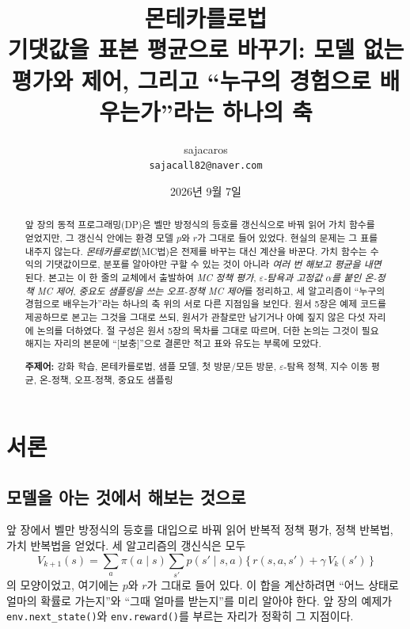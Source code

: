 \documentclass[11pt,a4paper]{article}
\title{\bfseries 몬테카를로법\\[2mm]
\large 기댓값을 표본 평균으로 바꾸기: 모델 없는 평가와 제어,
그리고 ``누구의 경험으로 배우는가''라는 하나의 축}
\author{sajacaros\\\small \texttt{sajacall82@naver.com}}
\date{2026년 9월 7일}
\begin{document}
\maketitle

\begin{abstract}
\noindent
앞 장의 동적 프로그래밍(DP)은 벨만 방정식의 등호를 갱신식으로 바꿔 읽어 가치 함수를 얻었지만, 그
갱신식 안에는 환경 모델 $p$와 $r$가 그대로 들어 있었다. 현실의 문제는 그 표를 내주지 않는다.
\emph{몬테카를로법}(MC법)은 전제를 바꾸는 대신 계산을 바꾼다. 가치 함수는 수익의 기댓값이므로,
분포를 알아야만 구할 수 있는 것이 아니라 \emph{여러 번 해보고 평균을 내면} 된다.
본고는 이 한 줄의 교체에서 출발하여 \emph{MC 정책 평가}, \emph{$\varepsilon$-탐욕과 고정값 $\alpha$를
붙인 온-정책 MC 제어}, \emph{중요도 샘플링을 쓰는 오프-정책 MC 제어}를 정리하고, 세 알고리즘이
``누구의 경험으로 배우는가''라는 하나의 축 위의 서로 다른 지점임을 보인다.
원서\cite{dlfs4} 5장은 예제 코드를 제공하므로 본고는 그것을 그대로 쓰되, 원서가 관찰로만 남기거나
아예 짚지 않은 다섯 자리에 논의를 더하였다. 절 구성은 원서 5장의 목차를 그대로 따르며, 더한 논의는
그것이 필요해지는 자리의 본문에 ``[보충]''으로 결론만 적고 표와 유도는 부록에 모았다.

\vspace{2mm}
\noindent\textbf{주제어:} 강화 학습, 몬테카를로법, 샘플 모델, 첫 방문/모든 방문, $\varepsilon$-탐욕
정책, 지수 이동 평균, 온-정책, 오프-정책, 중요도 샘플링
\end{abstract}

\tableofcontents
\vspace{4mm}

\section*{서론}

\subsection*{모델을 아는 것에서 해보는 것으로}

앞 장\cite{ch04}에서 벨만 방정식의 등호를 대입으로 바꿔 읽어 반복적 정책 평가, 정책 반복법, 가치
반복법을 얻었다. 세 알고리즘의 갱신식은 모두
\begin{equation*}
  V_{k+1}(s) = \sum_{a} \pi(a\mid s) \sum_{s'} p(s'\mid s,a)
               \bigl\{\, r(s,a,s') + \gamma\, V_k(s') \,\bigr\}
\end{equation*}
의 모양이었고, 여기에는 $p$와 $r$가 그대로 들어 있다. 이 합을 계산하려면 ``어느 상태로 얼마의 확률로
가는지''와 ``그때 얼마를 받는지''를 미리 알아야 한다. 앞 장의 예제가 \lstinline|env.next_state()|와
\lstinline|env.reward()|를 부르는 자리가 정확히 그 지점이다.
\end{document}
